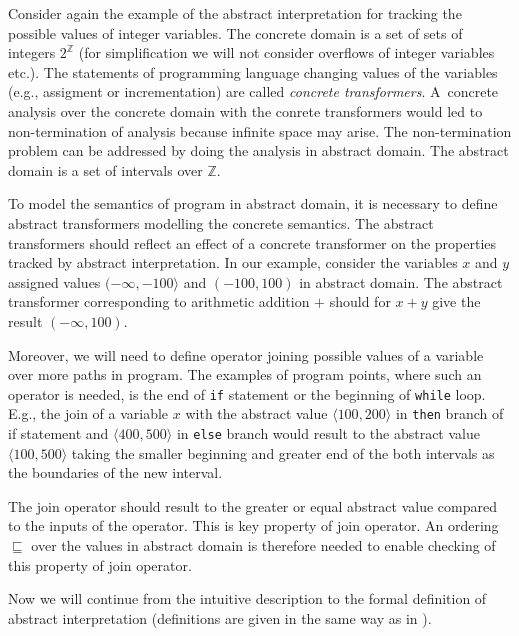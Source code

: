 \documentclass[a4paper, 12pt]{article}
\newcommand{\interval}[2]{\langle #1,#2 \rangle}
\newcommand{\aord}[0]{\sqsubseteq}
\begin{document}
Consider again the example of the abstract interpretation for tracking
the possible values of integer variables.
The concrete domain is a set of sets of integers $2^\mathbb{Z}$ (for simplification
we will not consider overflows of integer variables etc.).
The statements of programming language changing values of the variables
(e.g., assigment or incrementation) are called \emph{concrete transformers}.
A~concrete analysis over the concrete domain with the conrete transformers
would led to non-termination of analysis because infinite space may arise.
The non-termination problem can be addressed by doing the analysis in abstract domain.
The abstract domain is a set of intervals over $\mathbb{Z}$.

To model the semantics of program in abstract domain, it is necessary to define
abstract transformers modelling the concrete semantics.
The abstract transformers should reflect an effect of a concrete transformer
on the properties tracked by abstract interpretation.
In our example, consider the variables $x$ and $y$ assigned values $(-\infty,-100\rangle$
and $(-100, 100)$ in abstract domain.
The abstract transformer corresponding to arithmetic addition $+$
should for $x+y$ give the result $(-\infty,100)$.

Moreover, we will need to define operator joining possible values
of a variable over more paths in program.
The examples of program points, where such an operator is needed, is
the end of \texttt{if} statement or the beginning of \texttt{while} loop.
E.g., the join of a variable $x$
with the abstract value $\interval{100}{200}$ in \texttt{then} branch
of if statement and $\interval{400}{500}$ in \texttt{else} branch
would result to the abstract value $\interval{100}{500}$ taking the smaller beginning
and greater end of the both intervals as the boundaries of the new interval.

The join operator should result to the greater or
equal abstract value compared to the inputs of the operator.
This is key property of join operator.
An ordering $\aord$ over the values in abstract domain is therefore needed
to enable checking of this property of join operator.

Now we will continue from the intuitive description to
the formal definition of abstract interpretation (definitions
are given in the same way as in \cite{popl77}).
\end{document}
